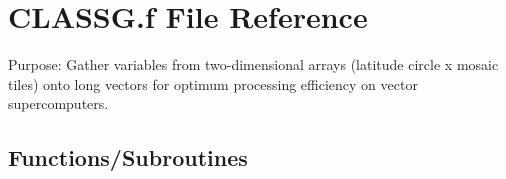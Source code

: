 \hypertarget{CLASSG_8f}{}\section{C\+L\+A\+S\+S\+G.\+f File Reference}
\label{CLASSG_8f}


Purpose\+: Gather variables from two-\/dimensional arrays (latitude circle x mosaic tiles) onto long vectors for optimum processing efficiency on vector supercomputers.  


\subsection*{Functions/\+Subroutines}
\begin{DoxyCompactItemize}
\item 

\end{DoxyCompactItemize}
